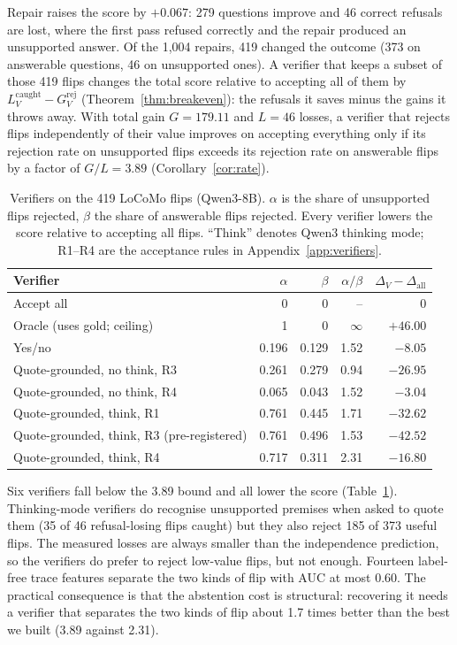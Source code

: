 \documentclass[10pt]{article}
\theoremstyle{plain}
\begin{document}
Repair raises the score by $+0.067$: 279 questions improve and 46 correct refusals are lost, where the first pass
refused correctly and the repair produced an unsupported answer. Of the 1,004 repairs, 419 changed the outcome (373 on
answerable questions, 46 on unsupported ones). A verifier that keeps a subset of those 419 flips changes the total score
relative to accepting all of them by $L^{\mathrm{caught}}_V-G^{\mathrm{rej}}_V$ (Theorem~\ref{thm:breakeven}): the
refusals it saves minus the gains it throws away. With total gain $G=179.11$ and $L=46$ losses, a verifier that rejects
flips independently of their value improves on accepting everything only if its rejection rate on unsupported flips
exceeds its rejection rate on answerable flips by a factor of $G/L=3.89$ (Corollary~\ref{cor:rate}).

\begin{table}[t]
\centering
\caption{Verifiers on the 419 LoCoMo flips (Qwen3-8B). $\alpha$ is the share of unsupported flips rejected, $\beta$ the
share of answerable flips rejected. Every verifier lowers the score relative to accepting all flips. ``Think'' denotes
Qwen3 thinking mode; R1--R4 are the acceptance rules in Appendix~\ref{app:verifiers}.}
\label{tab:verify}
\small
\begin{tabular}{lrrrr}
\toprule
Verifier & $\alpha$ & $\beta$ & $\alpha/\beta$ & $\Delta_V-\Delta_{\mathrm{all}}$ \\
\midrule
Accept all & 0 & 0 & -- & 0 \\
Oracle (uses gold; ceiling) & 1 & 0 & $\infty$ & $+46.00$ \\
\midrule
Yes/no & 0.196 & 0.129 & 1.52 & $-8.05$ \\
Quote-grounded, no think, R3 & 0.261 & 0.279 & 0.94 & $-26.95$ \\
Quote-grounded, no think, R4 & 0.065 & 0.043 & 1.52 & $-3.04$ \\
Quote-grounded, think, R1 & 0.761 & 0.445 & 1.71 & $-32.62$ \\
Quote-grounded, think, R3 (pre-registered) & 0.761 & 0.496 & 1.53 & $-42.52$ \\
Quote-grounded, think, R4 & 0.717 & 0.311 & 2.31 & $-16.80$ \\
\bottomrule
\end{tabular}
\end{table}

Six verifiers fall below the 3.89 bound and all lower the score (Table~\ref{tab:verify}). Thinking-mode verifiers do
recognise unsupported premises when asked to quote them (35 of 46 refusal-losing flips caught) but they also reject 185
of 373 useful flips. The measured losses are always smaller than the independence prediction, so the verifiers do prefer
to reject low-value flips, but not enough. Fourteen label-free trace features separate the two kinds of flip with AUC at
most 0.60. The practical consequence is that the abstention cost is structural: recovering it needs a verifier that
separates the two kinds of flip about 1.7 times better than the best we built (3.89 against 2.31).
\end{document}
